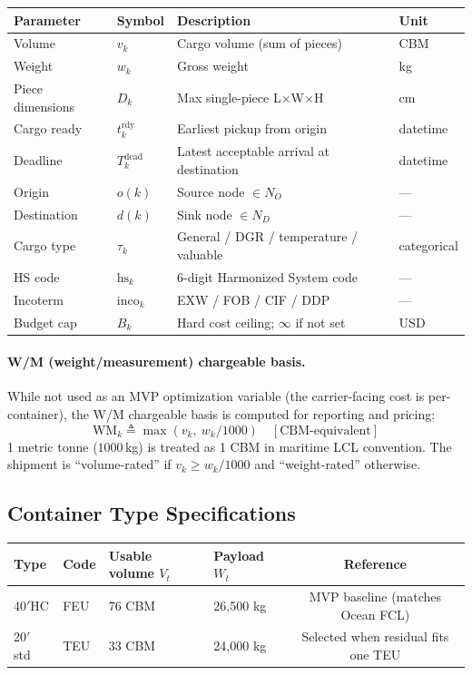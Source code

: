 \documentclass[11pt,a4paper]{article}
\newcommand{\defeq}{\triangleq}
\theoremstyle{definition}
\begin{document}
\begin{center}
\begin{tabular}{llp{6.5cm}l}
\toprule
Parameter & Symbol & Description & Unit \\
\midrule
Volume & $v_k$ & Cargo volume (sum of pieces) & CBM \\
Weight & $w_k$ & Gross weight & kg \\
Piece dimensions & $D_k$ & Max single-piece L$\times$W$\times$H & cm \\
Cargo ready & $t_k^{\text{rdy}}$ & Earliest pickup from origin & datetime \\
Deadline & $T_k^{\text{dead}}$ & Latest acceptable arrival at destination & datetime \\
Origin & $o(k)$ & Source node $\in N_O$ & — \\
Destination & $d(k)$ & Sink node $\in N_D$ & — \\
Cargo type & $\tau_k$ & General / DGR / temperature / valuable & categorical \\
HS code & $\text{hs}_k$ & 6-digit Harmonized System code & — \\
Incoterm & $\text{inco}_k$ & EXW / FOB / CIF / DDP & — \\
Budget cap & $B_k$ & Hard cost ceiling; $\infty$ if not set & USD \\
\bottomrule
\end{tabular}
\end{center}

\paragraph{W/M (weight/measurement) chargeable basis.}
While not used as an MVP optimization variable (the carrier-facing cost is per-container), the
W/M chargeable basis is computed for reporting and pricing:
\begin{equation}
  \text{WM}_k \defeq \max\!\left(v_k,\ w_k / 1000\right) \quad [\text{CBM-equivalent}]
  \label{eq:wm}
\end{equation}
1 metric tonne ($1000$\,kg) is treated as 1 CBM in maritime LCL convention. The shipment is
``volume-rated'' if $v_k \geq w_k / 1000$ and ``weight-rated'' otherwise.

\subsection{Container Type Specifications}

\begin{center}
\begin{tabular}{llllc}
\toprule
Type & Code & Usable volume $V_t$ & Payload $W_t$ & Reference \\
\midrule
40$'$HC & FEU & 76 CBM & 26,500 kg & MVP baseline (matches Ocean FCL) \\
20$'$ std & TEU & 33 CBM & 24,000 kg & Selected when residual fits one TEU \\
\bottomrule
\end{tabular}
\end{center}
\end{document}
